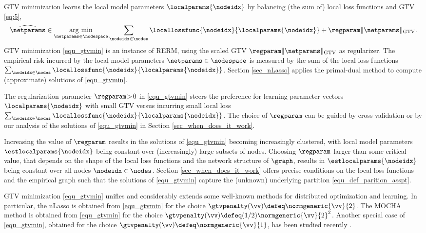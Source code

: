 \documentclass[lettersize,journal]{IEEEtran}
\begin{document}
GTV minimization learns the local model parameters $\localparams{\nodeidx}$ by balancing (the sum of) 
local loss functions and GTV \eqref{eq:5}, 
\begin{equation} 
\label{equ_gtvmin}
\widehat{\netparams} \in \underset{\netparams \in \nodespace}{\mathrm{arg \ min}}\sum_{\nodeidx \in \nodes} \locallossfunc{\nodeidx}{\localparams{\nodeidx}} + \regparam \|\netparams\|_{\rm GTV}.
\vspace{-2mm}
\end{equation}
GTV minimization \eqref{equ_gtvmin} is an instance of RERM, using the scaled GTV $\regparam \|\netparams\|_{\rm GTV}$ as 
regularizer. The empirical risk incurred by the local model parameters $\netparams \in \nodespace$ 
is measured by the sum of the local loss functions $\sum_{\nodeidx \in \nodes} \locallossfunc{\nodeidx}{\localparams{\nodeidx}}$. 
Section \ref{sec_nLasso} applies the primal-dual method \cite[Alg. 6]{pock_chambolle_2016} to compute (approximate) solutions of \eqref{equ_gtvmin}. 


The regularization parameter $\regparam\!>\!0$ in \eqref{equ_gtvmin} steers the preference for learning 
parameter vectors $\localparams{\nodeidx}$ with small GTV versus incurring small local loss 
$\sum_{\nodeidx \in \nodes} \locallossfunc{\nodeidx}{\localparams{\nodeidx}}$. The choice of $\regparam$ 
can be guided by cross validation \cite{hastie01statisticallearning} or by our analysis of the solutions of \eqref{equ_gtvmin} 
in Section \ref{sec_when_does_it_work}. 

Increasing the value of $\regparam$ results in the solutions of \eqref{equ_gtvmin} becoming 
increasingly clustered, with local model parameters $\estlocalparams{\nodeidx}$ being constant over (increasingly) large 
subsets of nodes. Choosing $\regparam$ larger than some critical value, that depends on the shape of 
the local loss functions and the network structure of $\graph$, results in $\estlocalparams{\nodeidx}$ 
being constant over all nodes $\nodeidx \in \nodes$. Section \ref{sec_when_does_it_work} offers precise 
conditions on the local loss functions and the empirical graph such that the solutions of \eqref{equ_gtvmin} 
capture the (unknown) underlying partition \eqref{equ_def_parition_asspt}. 

GTV minimization \eqref{equ_gtvmin} unifies and considerably extends some well-known methods for 
distributed optimization and learning. In particular, the nLasso \cite{NetworkLasso} is obtained from 
\eqref{equ_gtvmin} for the choice $\gtvpenalty(\vv) \defeq \normgeneric{\vv}{2}$. The {\rm MOCHA} method \cite{Smith2017} is obtained 
from \eqref{equ_gtvmin} for the choice $\gtvpenalty(\vv) \defeq (1/2) \normgeneric{\vv}{2}^{2}$. Another 
special case of \eqref{equ_gtvmin}, obtained for the choice $\gtvpenalty(\vv) \defeq \normgeneric{\vv}{1}$, has been 
studied recently \cite{Sarchesh2021}. 
\end{document}
